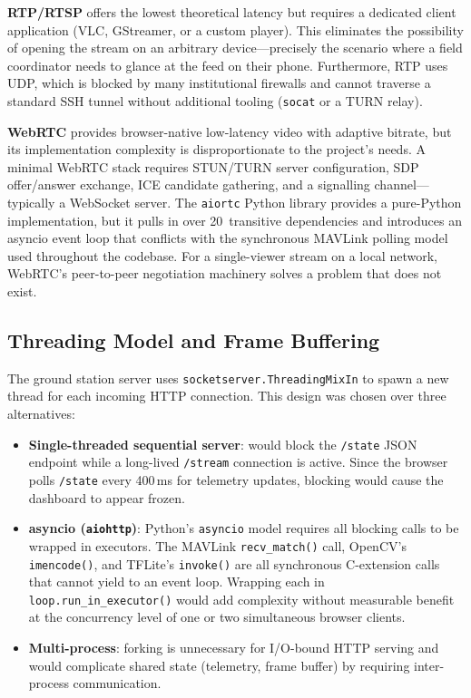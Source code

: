 \textbf{RTP/RTSP} offers the lowest theoretical latency but requires a dedicated client
application (VLC, GStreamer, or a custom player). This eliminates the possibility of
opening the stream on an arbitrary device---precisely the scenario where a field
coordinator needs to glance at the feed on their phone. Furthermore, RTP uses UDP,
which is blocked by many institutional firewalls and cannot traverse a standard SSH
tunnel without additional tooling (\texttt{socat} or a TURN relay).

\textbf{WebRTC} provides browser-native low-latency video with adaptive bitrate, but its
implementation complexity is disproportionate to the project's needs. A minimal WebRTC
stack requires STUN/TURN server configuration, SDP offer/answer exchange, ICE candidate
gathering, and a signalling channel---typically a WebSocket server. The
\texttt{aiortc} Python library provides a pure-Python implementation, but it pulls in
over 20~transitive dependencies and introduces an asyncio event loop that conflicts with
the synchronous MAVLink polling model used throughout the codebase. For a single-viewer
stream on a local network, WebRTC's peer-to-peer negotiation machinery solves a problem
that does not exist.

\subsection{Threading Model and Frame Buffering}\label{sec:threading-model}

The ground station server uses \texttt{socketserver.ThreadingMixIn} to spawn a new
thread for each incoming HTTP connection. This design was chosen over three
alternatives:

\begin{itemize}
  \item \textbf{Single-threaded sequential server}: would block the \texttt{/state} JSON
        endpoint while a long-lived \texttt{/stream} connection is active. Since the
        browser polls \texttt{/state} every 400\,ms for telemetry updates, blocking would
        cause the dashboard to appear frozen.
  \item \textbf{asyncio (\texttt{aiohttp})}: Python's \texttt{asyncio} model requires
        all blocking calls to be wrapped in executors. The MAVLink
        \texttt{recv\_match()} call, OpenCV's \texttt{imencode()}, and TFLite's
        \texttt{invoke()} are all synchronous C-extension calls that cannot yield to an
        event loop. Wrapping each in \texttt{loop.run\_in\_executor()} would add
        complexity without measurable benefit at the concurrency level of one or two
        simultaneous browser clients.
  \item \textbf{Multi-process}: forking is unnecessary for I/O-bound HTTP serving and
        would complicate shared state (telemetry, frame buffer) by requiring
        inter-process communication.
\end{itemize}

